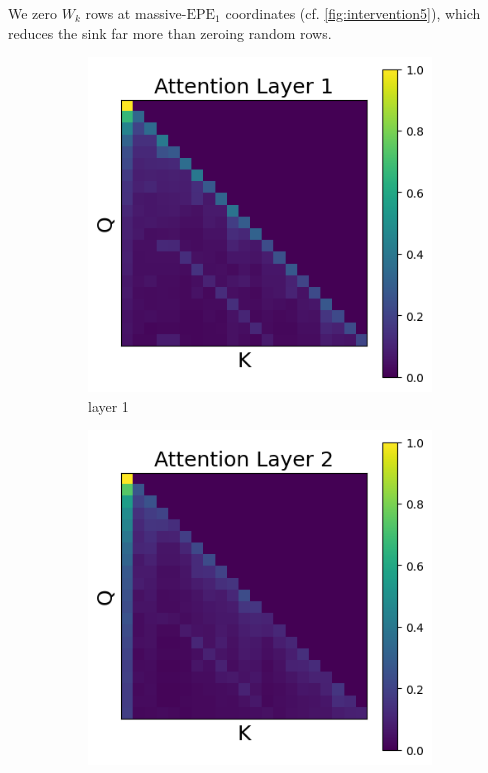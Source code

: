 \documentclass[11pt]{article}
\begin{document}
We zero $W_k$ rows at massive-$\mathrm{EPE}_1$ coordinates (cf. \cref{fig:intervention5}), which reduces the sink far more than zeroing random rows.
\begin{figure}[t]
  \begin{subfigure}[t]{0.24\textwidth}
    \centering
    \includegraphics[width=1.4\columnwidth]{figures/intervention5/layer_1.png}
    \caption{layer 1}
  \end{subfigure}\hfill
  \begin{subfigure}[t]{0.24\textwidth}
    \centering
    \includegraphics[width=1.4\columnwidth]{figures/intervention5/layer_2.png}

\end{subfigure}
\end{figure}
\end{document}
